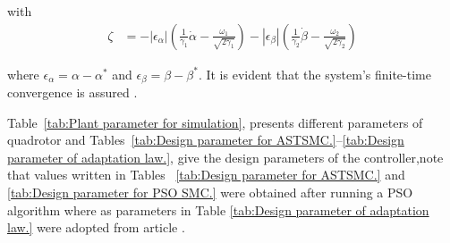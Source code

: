 \begin{small}
\begin{enumerate}
with
\begin{align}
\zeta &= -|\epsilon_\alpha|\left(\tfrac{1}{\gamma_1}\dot{\alpha} - \tfrac{\omega_1}{\sqrt{2\gamma_1}}\right) 
        - |\epsilon_\beta|\left(\tfrac{1}{\gamma_2}\dot{\beta} - \tfrac{\omega_2}{\sqrt{2\gamma_2}}\right) \label{4.30}
\end{align}

where $\epsilon_\alpha = \alpha - \alpha^*$ and $\epsilon_\beta = \beta - \beta^*$. 
It is evident that the system’s finite-time convergence is assured 
\cite{besnard2007control}.


\begin{table}[htbp]
\centering

\caption[Plant parameter]{Plant parameter.  \cite{bresciani2008modelling}}
\label{tab:Plant parameter for simulation}

\end{table}

Table~\ref{tab:Plant parameter for simulation},  presents different  parameters of quadrotor and Tables~\ref{tab:Design parameter for ASTSMC.}--\ref{tab:Design parameter of adaptation law.}, give the design parameters of the controller,note that values written in Tables ~\ref{tab:Design parameter for ASTSMC.} and \ref{tab:Design parameter for PSO SMC.} were obtained after running a PSO algorithm where as parameters in Table \ref{tab:Design parameter of adaptation law.} were adopted from article \cite{abera2024improved}.  


\end{enumerate}
\end{small}
